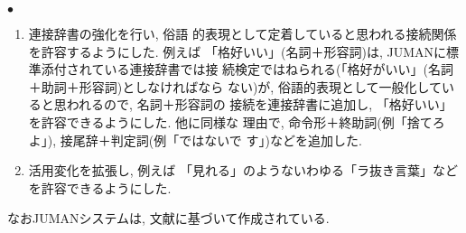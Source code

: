 \begin{list}{\Large $\bullet$}{}
\begin{enumerate}
\item 連接辞書の強化を行い, 俗語
的表現として定着していると思われる接続関係を許容するようにした. 例えば
「格好いい」(名詞＋形容詞)は, JUMANに標準添付されている連接辞書では接
続検定ではねられる(「格好がいい」(名詞＋助詞＋形容詞)としなければなら
ない)が, 俗語的表現として一般化していると思われるので, 名詞＋形容詞の
接続を連接辞書に追加し, 「格好いい」を許容できるようにした. 他に同様な
理由で, 命令形＋終助詞(例「捨てろよ」), 接尾辞＋判定詞(例「ではないで
す」)などを追加した. 

\item 活用変化を拡張し, 例えば
「見れる」のようないわゆる「ラ抜き言葉」などを許容できるようにした.

\end{enumerate}
\end{list}

なおJUMANシステムは, 文献\cite{Masuoka1989}に基づいて作成されている. 




\newpage
\begin{biography}



\end{biography}


